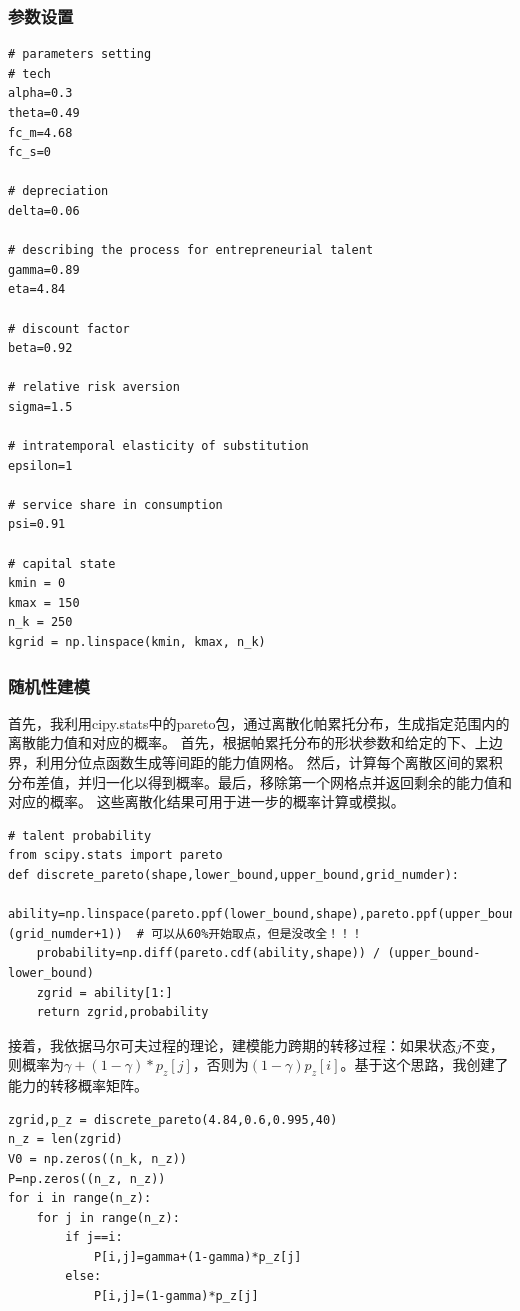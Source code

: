 \documentclass[a4paper, 12pt]{ctexart}
\begin{document}
\subsubsection{参数设置}
\begin{lstlisting}
# parameters setting
# tech
alpha=0.3
theta=0.49
fc_m=4.68
fc_s=0

# depreciation
delta=0.06

# describing the process for entrepreneurial talent
gamma=0.89
eta=4.84

# discount factor
beta=0.92

# relative risk aversion
sigma=1.5

# intratemporal elasticity of substitution
epsilon=1

# service share in consumption
psi=0.91

# capital state
kmin = 0
kmax = 150
n_k = 250
kgrid = np.linspace(kmin, kmax, n_k)
\end{lstlisting}

\subsubsection{随机性建模}
首先，我利用cipy.stats中的pareto包，通过离散化帕累托分布，生成指定范围内的离散能力值和对应的概率。
首先，根据帕累托分布的形状参数和给定的下、上边界，利用分位点函数生成等间距的能力值网格。
然后，计算每个离散区间的累积分布差值，并归一化以得到概率。最后，移除第一个网格点并返回剩余的能力值和对应的概率。
这些离散化结果可用于进一步的概率计算或模拟。
\begin{lstlisting}
# talent probability
from scipy.stats import pareto
def discrete_pareto(shape,lower_bound,upper_bound,grid_numder):
    ability=np.linspace(pareto.ppf(lower_bound,shape),pareto.ppf(upper_bound,shape),(grid_numder+1))  # 可以从60%开始取点，但是没改全！！！
    probability=np.diff(pareto.cdf(ability,shape)) / (upper_bound-lower_bound)
    zgrid = ability[1:]
    return zgrid,probability
\end{lstlisting}
接着，我依据马尔可夫过程的理论，建模能力跨期的转移过程：如果状态$j$不变，则概率为$\gamma+(1-\gamma)*p_z[j]$，否则为$(1-\gamma)p_z[i]$。基于这个思路，我创建了能力的转移概率矩阵。
\begin{lstlisting}
zgrid,p_z = discrete_pareto(4.84,0.6,0.995,40)
n_z = len(zgrid)
V0 = np.zeros((n_k, n_z))
P=np.zeros((n_z, n_z))
for i in range(n_z):
    for j in range(n_z):
        if j==i:
            P[i,j]=gamma+(1-gamma)*p_z[j]
        else:
            P[i,j]=(1-gamma)*p_z[j]
\end{lstlisting}
\end{document}
